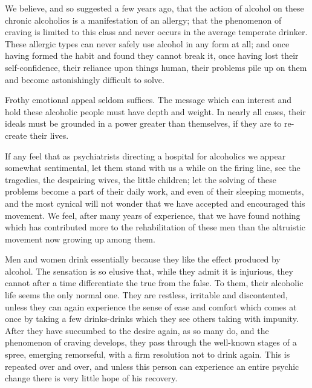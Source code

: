 \begin{biblechapter}
    We believe, and so suggested a few years ago, 
    that the action of alcohol on these chronic alcoholics is a manifestation of an allergy; 
    that the phenomenon of craving is limited to this class and never occurs in the average temperate drinker. 
\verse These allergic types can never safely use alcohol in any form at all; 
    and once having formed the habit and found they cannot break it, 
    once having lost their self-confidence, 
    their reliance upon things human, 
    their problems pile up on them and become astonishingly difficult to solve.

\verse Frothy emotional appeal seldom suffices. 
\verse The message which can interest and hold these alcoholic people must have depth and weight. 
\verse In nearly all cases, their ideals must be grounded in a power greater than themselves, 
    if they are to re-create their lives.

\verse If any feel that as psychiatrists directing a hospital for alcoholics we appear somewhat sentimental, 
    let them stand with us a while on the firing line, 
    see the tragedies, the despairing wives, the little children; 
    let the solving of these problems become a part of their daily work, 
    and even of their sleeping moments, 
    and the most cynical will not wonder that we have accepted and encouraged this movement. 
\verse We feel, after many years of experience, 
    that we have found nothing which has contributed more to the rehabilitation of these men 
    than the altruistic movement now growing up among them.

\verse Men and women drink essentially because they like the effect produced by alcohol. 
\verse The sensation is so elusive that, while they admit it is injurious, 
    they cannot after a time differentiate the true from the false. 
\verse To them, their alcoholic life seems the only normal one. 
\verse They are restless, irritable and discontented, 
    unless they can again experience the sense of ease and comfort 
    which comes at once by taking a few drinks-drinks which they see others taking with impunity. 
\verse After they have succumbed to the desire again, as so many do, 
    and the phenomenon of craving develops, 
    they pass through the well-known stages of a spree, emerging remorseful, 
    with a firm resolution not to drink again. 
\verse This is repeated over and over, 
    and unless this person can experience an entire psychic change there is very little hope of his recovery.


\end{biblechapter}
